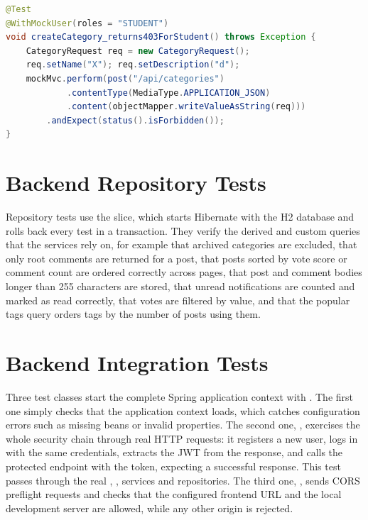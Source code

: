 \begin{lstlisting}[language=Java,caption={Verifying role-based access control (\texttt{CategoryControllerTests.java})},label={lst:test-403}]
@Test
@WithMockUser(roles = "STUDENT")
void createCategory_returns403ForStudent() throws Exception {
    CategoryRequest req = new CategoryRequest();
    req.setName("X"); req.setDescription("d");
    mockMvc.perform(post("/api/categories")
            .contentType(MediaType.APPLICATION_JSON)
            .content(objectMapper.writeValueAsString(req)))
        .andExpect(status().isForbidden());
}
\end{lstlisting}

\section{Backend Repository Tests}

Repository tests use the  slice, which starts Hibernate with the H2
database and rolls back every test in a transaction. They verify the derived and custom
queries that the services rely on, for example that archived categories are excluded,
that only root comments are returned for a post, that posts sorted by vote score or
comment count are ordered correctly across pages, that post and comment bodies longer
than 255 characters are stored, that unread notifications are counted
and marked as read correctly, that votes are filtered by value, and that the popular
tags query orders tags by the number of posts using them.

\section{Backend Integration Tests}

Three test classes start the complete Spring application context with
. The first one simply checks that the application context loads, which catches configuration
errors such as missing beans or invalid properties. The second one,
, exercises the whole security chain through real HTTP
requests: it registers a new user, logs in with the same credentials, extracts the JWT
from the response, and calls the protected  endpoint with the
token, expecting a successful response. This test passes through the real
, , services and repositories. The third one,
, sends CORS preflight requests and checks that the configured
frontend URL and the local development server are allowed, while any other origin is
rejected.

